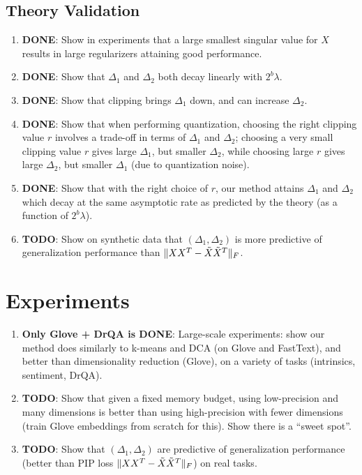 \documentclass[12pt]{article}
\begin{document}
\subsection{Theory Validation}
\begin{enumerate}
	\item \textbf{DONE}: Show in experiments that a large smallest singular value for $X$ results in large regularizers attaining good performance.
	\item \textbf{DONE}: Show that $\Delta_1$ and $\Delta_2$ both decay linearly with $2^b \lambda$.
	\item \textbf{DONE}: Show that clipping brings $\Delta_1$ down, and can increase $\Delta_2$.
	\item \textbf{DONE}: Show that when performing quantization, choosing the right clipping value $r$ involves a trade-off in terms of $\Delta_1$ and $\Delta_2$;
	choosing a very small clipping value $r$ gives large $\Delta_1$, but smaller $\Delta_2$, while choosing large $r$ gives large $\Delta_2$, but smaller $\Delta_1$ (due to quantization noise).
	\item \textbf{DONE}: Show that with the right choice of $r$, our method attains $\Delta_1$ and $\Delta_2$ which decay at the same asymptotic rate as predicted by the theory (as a function of $2^b\lambda$).
	\item \textbf{TODO}: Show on synthetic data that $(\Delta_1,\Delta_2)$ is more predictive of generalization performance than $\|XX^T - \tX\tX^T\|_F$.
\end{enumerate}

\section{Experiments}
\begin{enumerate}
	\item \textbf{Only Glove + DrQA is DONE}: Large-scale experiments: show our method does similarly to k-means and DCA (on Glove and FastText), and better than dimensionality reduction (Glove), on a variety of tasks (intrinsics, sentiment, DrQA).
	\item \textbf{TODO}: Show that given a fixed memory budget, using low-precision and many dimensions is better than using high-precision with fewer dimensions (train Glove embeddings from scratch for this).  Show there is a ``sweet spot''.
	\item \textbf{TODO}: Show that $(\Delta_1,\Delta_2)$ are predictive of generalization performance (better than PIP loss $\|XX^T - \tX\tX^T\|_F$) on real tasks.
\end{enumerate}
\end{document}
